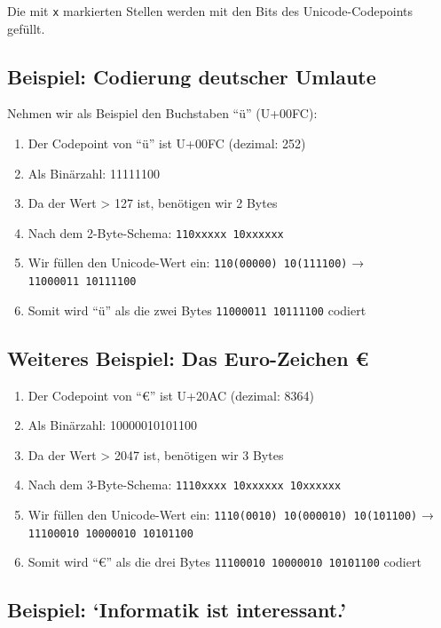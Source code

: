 \documentclass[
  nswissgerman,
  a4paper,
  DIV=11,
  numbers=noendperiod,
  ngerman]{scrreprt}
\providecommand{\tightlist}{%
  \setlength{\itemsep}{0pt}\setlength{\parskip}{0pt}}
\begin{document}
Die mit \texttt{x} markierten Stellen werden mit den Bits des
Unicode-Codepoints gefüllt.

\subsection{Beispiel: Codierung deutscher
Umlaute}\label{beispiel-codierung-deutscher-umlaute}

Nehmen wir als Beispiel den Buchstaben ``ü'' (U+00FC):

\begin{enumerate}
\def\labelenumi{\arabic{enumi}.}
\tightlist
\item
  Der Codepoint von ``ü'' ist U+00FC (dezimal: 252)
\item
  Als Binärzahl: 11111100
\item
  Da der Wert \textgreater{} 127 ist, benötigen wir 2 Bytes
\item
  Nach dem 2-Byte-Schema: \texttt{110xxxxx\ 10xxxxxx}
\item
  Wir füllen den Unicode-Wert ein: \texttt{110(00000)\ 10(111100)} →
  \texttt{11000011\ 10111100}
\item
  Somit wird ``ü'' als die zwei Bytes \texttt{11000011\ 10111100}
  codiert
\end{enumerate}

\subsection{Weiteres Beispiel: Das Euro-Zeichen
€}\label{weiteres-beispiel-das-euro-zeichen}

\begin{enumerate}
\def\labelenumi{\arabic{enumi}.}
\tightlist
\item
  Der Codepoint von ``€'' ist U+20AC (dezimal: 8364)
\item
  Als Binärzahl: 10000010101100
\item
  Da der Wert \textgreater{} 2047 ist, benötigen wir 3 Bytes
\item
  Nach dem 3-Byte-Schema: \texttt{1110xxxx\ 10xxxxxx\ 10xxxxxx}
\item
  Wir füllen den Unicode-Wert ein:
  \texttt{1110(0010)\ 10(000010)\ 10(101100)} →
  \texttt{11100010\ 10000010\ 10101100}
\item
  Somit wird ``€'' als die drei Bytes
  \texttt{11100010\ 10000010\ 10101100} codiert
\end{enumerate}

\subsection{Beispiel: `Informatik ist
interessant.'}\label{beispiel-informatik-ist-interessant.}
\end{document}
